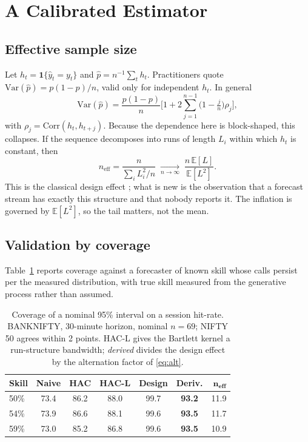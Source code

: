 \documentclass[conference]{IEEEtran}
\begin{document}
\section{A Calibrated Estimator}
\label{sec:est}

\subsection{Effective sample size}

Let $h_t = \mathbf{1}\{\hat{y}_t = y_t\}$ and $\hat{p} = n^{-1}\sum_t h_t$.
Practitioners quote $\mathrm{Var}(\hat{p}) = p(1-p)/n$, valid only for
independent $h_t$. In general
\begin{equation}
\mathrm{Var}(\hat{p}) = \frac{p(1-p)}{n}
\Big[1 + 2\sum_{j=1}^{n-1}\big(1 - \tfrac{j}{n}\big)\rho_j\Big],
\label{eq:var}
\end{equation}
with $\rho_j = \mathrm{Corr}(h_t,h_{t+j})$. Because the dependence here is
block-shaped, this collapses. If the sequence decomposes into runs of length
$L_i$ within which $h_t$ is constant, then
\begin{equation}
n_{\text{eff}} = \frac{n}{\sum_i L_i^2/n}
\;\xrightarrow[n\to\infty]{}\; \frac{n\,\mathbb{E}[L]}{\mathbb{E}[L^2]}.
\label{eq:neff}
\end{equation}
This is the classical design effect \cite{kish1965,moulton1990}; what is new is
the observation that a forecast stream has exactly this structure and that
nobody reports it. The inflation is governed by $\mathbb{E}[L^2]$, so the tail
matters, not the mean.

\subsection{Validation by coverage}

Table~\ref{tab:cov} reports coverage against a forecaster of known skill whose
calls persist per the measured distribution, with true skill measured from the
generative process rather than assumed.

\begin{table}[t]
\caption{Coverage of a nominal 95\% interval on a session hit-rate. BANKNIFTY,
30-minute horizon, nominal $n=69$; NIFTY 50 agrees within 2 points. HAC-L gives
the Bartlett kernel a run-structure bandwidth; \emph{derived} divides the design
effect by the alternation factor of \eqref{eq:alt}.}
\label{tab:cov}
\small
\footnotesize
\begin{tabular}{@{}lcccccr@{}}
\toprule
\textbf{Skill} & \textbf{Naive} & \textbf{HAC} & \textbf{HAC-L} &
\textbf{Design} & \textbf{Deriv.} & $\boldsymbol{n_{\text{eff}}}$ \\
\midrule
50\% & 73.4 & 86.2 & 88.0 & 99.7 & \textbf{93.2} & 11.9 \\
54\% & 73.9 & 86.6 & 88.1 & 99.6 & \textbf{93.5} & 11.7 \\
59\% & 73.0 & 85.2 & 86.8 & 99.6 & \textbf{93.5} & 10.9 \\
\bottomrule
\end{tabular}
\end{table}
\end{document}
